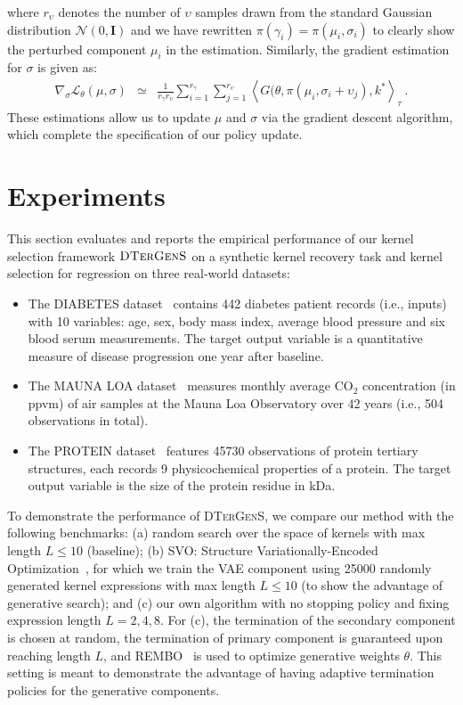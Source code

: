 where $r_\upsilon$ denotes the number of $\upsilon$ samples drawn from the standard Gaussian distribution $\mathcal{N}(0, \mathbf{I})$ and we have rewritten $\pi(\gamma_i) = \pi(\mu_i, \sigma_i)$ to clearly show the perturbed component $\mu_i$ in the estimation. Similarly, the gradient estimation for $\sigma$ is given as:
\begin{eqnarray}
\nabla_{\sigma} \mathcal{L}_\theta(\mu, \sigma) &\simeq& \frac{1}{r_\gamma r_\upsilon} \sum_{i=1}^{r_\gamma}\sum_{j=1}^{r_\upsilon} \left\langle G(\theta, \pi(\mu_i, \sigma_i + \upsilon_j), k^{\ast} \right\rangle_{\tau} \ .
\end{eqnarray}
These estimations allow us to update $\mu$ and $\sigma$ via the gradient descent algorithm, which complete the specification of our policy update. 

\section{Experiments}
\label{app-ks-sec:exp}
This section evaluates and reports the empirical performance of our kernel selection framework $\textsc{DTerGenS}$ on a synthetic kernel recovery task and kernel selection for regression on three real-world datasets:
\begin{itemize}
\item The DIABETES dataset~\cite{UCI_diabetes_data} contains 442 diabetes patient records (i.e., inputs) with 10 variables: age, sex, body mass index, average blood pressure and six blood serum measurements. The target output variable is a quantitative measure of disease progression one year after baseline.
\item The MAUNA LOA dataset~\cite{mauna_loa_data} measures monthly average $\mathrm{CO}_2$ concentration (in ppvm) of air samples at the Mauna Loa Observatory over 42 years (i.e., 504 observations in total).
\item The PROTEIN dataset~\cite{UCI_protein_data} features 45730 observations of protein tertiary structures, each records 9 physicochemical properties of a protein. The target output variable is the size of the protein residue in kDa.
\end{itemize}
To demonstrate the performance of \textsc{DTerGenS}, we compare our method with the following benchmarks: (a) random search over the space of kernels with max length $L \leq 10$ (baseline); (b) \textsc{SVO}: Structure Variationally-Encoded Optimization~\cite{Lu18}, for which we train the VAE component using 25000 randomly generated kernel expressions with max length $L \leq 10$ (to show the advantage of generative search); and (c) our own algorithm with no stopping policy and fixing expression length $L = 2, 4, 8$. For (c), the termination of the secondary component is chosen at random, the termination of primary component is guaranteed upon reaching length $L$, and REMBO~\cite{Wang16} is used to optimize generative weights $\theta$. This setting is meant to demonstrate the advantage of having adaptive termination policies for the generative components. 

